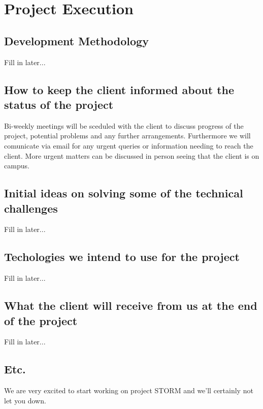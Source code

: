 \documentclass[12pt, oneside]{article}
\begin{document}
\section{Project Execution}
	\subsection{Development Methodology}
		Fill in later...
	\subsection{How to keep the client informed about the status of the project}
		Bi-weekly meetings will be sceduled with the client to discuss progress of the project, potential problems and any further arrangements. Furthermore we will comunicate via email for any urgent queries or information needing to reach the client. More urgent matters can be discussed in person seeing that the client is on campus. 
	\subsection{Initial ideas on solving some of the technical challenges}
		Fill in later...
	\subsection{Techologies we intend to use for the project}
		Fill in later...
	\subsection{What the client will receive from us at the end of the project}
		Fill in later...
	\subsection{Etc.}
		We are very excited to start working on project STORM and we'll certainly not let you down.
\end{document}

